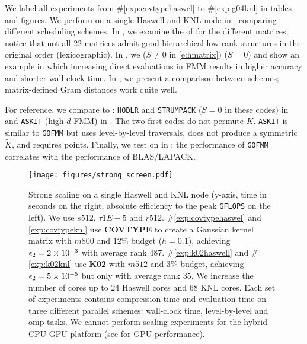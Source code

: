 We label all experiments from \#\ref{exp:covtypehaswel} to
\#\ref{exp:g04knl} in tables and figures.
We perform  on a single Haswell and KNL node
in , comparing different scheduling schemes.
In , we examine the  of \gofmm{}  for the different matrices; notice that not all 22 matrices admit good hierarchical low-rank
structures in the original order (lexicographic). In , we
 ($S\neq 0$ in \eqref{e:hmatrix})  ($S=0$)
and show an example in which increasing direct evaluations in FMM results in higher accuracy and shorter wall-clock time. 
In , we present a comparison between 
 schemes; matrix-defined Gram distances work quite well.

For reference, we compare \gofmm{} to :
\texttt{HODLR} and \texttt{STRUMPACK} ($S=0$ in these codes) in
 and \texttt{ASKIT} (high-$d$ FMM) in . 
The two first codes do not permute $K$. \texttt{ASKIT} is similar to \texttt{GOFMM} but uses level-by-level traversals, does not produce a symmetric $\tilde{K}$,  and requires points.   Finally, we test \gofmm{} on  in ; the performance of \texttt{GOFMM} correlates with the performance of BLAS/LAPACK.

\begin{figure}[!t]
  \centering
  \texttt{[image: figures/strong\_screen.pdf]}
  \caption{
  Strong scaling on a single Haswell and KNL node
  (y-axis, time in seconds on the right, absolute efficiency to the
  peak \texttt{GFLOPS} on the left).
  We use $s512$, $\tau1E-5$ and $r512$.
  \#\ref{exp:covtypehaswel} and \ref{exp:covtypeknl}
  use \textbf{COVTYPE} to create a Gaussian kernel matrix with 
  $m800$ and $12\%$ budget ($h=0.1$), achieving $\epsilon_2 = \num{2E-3}$
  with average rank $487$.
  \#\ref{exp:k02haswell} and \#\ref{exp:k02knl} use \textbf{K02}
  with $m512$ and $3\%$ budget, achieving $\epsilon_2=\num{5E-5}$
  but only with average rank $35$. 
  We increase the number of cores up to 24 Haswell cores and 68 KNL
  cores. Each set of experiments contains compression time and evaluation time on
  three different parallel schemes: wall-clock time, level-by-level and omp tasks.
  We cannot perform scaling experiments for the hybrid CPU-GPU platform
  (see  for GPU performance).
  }
  \label{fig:scaling}
\end{figure}


